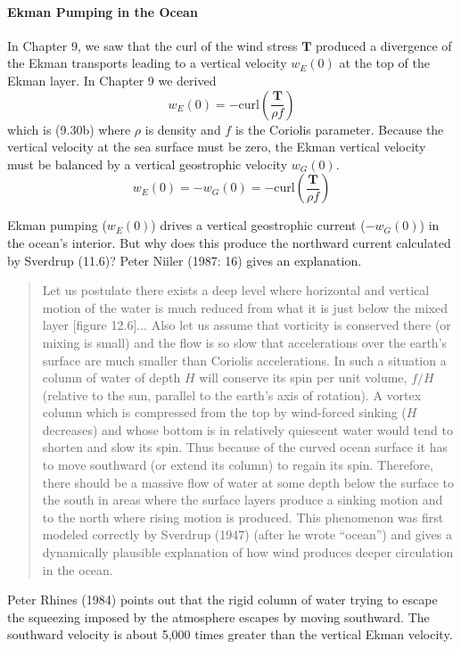 \paragraph{Ekman Pumping in the Ocean}
In Chapter 9, we saw that the curl of the wind
stress $\mathbf{T}$ produced a divergence
of the Ekman transports leading to a vertical
velocity $w_E (0)$ at the top of the Ekman layer. In Chapter 9 we
derived
\begin{equation}
w_E (0) = -\text{curl}\left(\frac{\mathbf{T}}{\rho f} \right)
\end{equation}
which is (9.30b) where $\rho$ is density and $f$ is the Coriolis
parameter. Because the vertical velocity at
the sea surface must be zero, the Ekman vertical velocity must be
balanced by a vertical geostrophic velocity $w_G(0)$.
\begin{equation}
w_E (0) = - w_G (0) = -\text{curl}\left(\frac{\mathbf{T}}{\rho f} \right)
\end{equation}

Ekman pumping ($w_E (0)$) drives a vertical geostrophic current ($-w_G
(0)$) in the ocean's interior. But why does this produce the northward
current calculated by Sverdrup (11.6)? Peter Niiler (1987: 16) gives
an explanation.

\begin{quotation} \small
Let us postulate there exists a deep level where horizontal and
vertical motion of the water is much reduced from what it is just
below the mixed layer [figure
  12.6]$\ldots$ Also let us assume that vorticity is conserved there
(or mixing is small) and the flow is so slow that accelerations over
the earth's surface are much smaller than Coriolis accelerations. In
such a situation a column of water of depth $H$ will conserve its spin
per unit volume, $f/H$ (relative to the sun, parallel to the earth's
axis of rotation).  A vortex column which is compressed from the top
by wind-forced sinking ($H$ decreases) and whose bottom is in
relatively quiescent water would tend to shorten and slow its
spin. Thus because of the curved ocean surface it has to move
southward (or extend its column) to regain its spin. Therefore, there
should be a massive flow of water at some depth below the surface to
the south in areas where the surface layers produce a sinking motion
and to the north where rising motion is produced. This phenomenon was
first modeled correctly by Sverdrup (1947) (after he wrote ``ocean'')
and gives a dynamically plausible explanation of how wind produces
deeper circulation in the ocean.
\end{quotation}
Peter Rhines (1984) points out that the rigid column of water trying
to escape the squeezing imposed by the atmosphere escapes by moving
southward. The southward velocity is about 5,000 times greater than
the vertical Ekman velocity.

